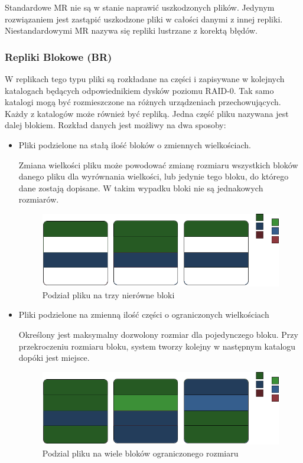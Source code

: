 Standardowe MR nie są w stanie naprawić uszkodzonych plików. Jedynym rozwiązaniem jest zastąpić uszkodzone pliki w całości danymi z innej repliki. Niestandardowymi MR nazywa się repliki lustrzane z korektą błędów.
\subsubsection{Repliki Blokowe (BR)}
W replikach tego typu pliki są rozkładane na części i zapisywane w kolejnych katalogach będących odpowiednikiem dysków poziomu RAID-0. Tak samo katalogi mogą być rozmieszczone na różnych urządzeniach przechowujących. Każdy z katalogów może również być repliką. Jedna część pliku nazywana jest dalej blokiem.
Rozkład danych jest możliwy na dwa sposoby:
\begin{itemize}
    \item Pliki podzielone na stałą ilość bloków o zmiennych wielkościach. 

            Zmiana wielkości pliku może powodować zmianę rozmiaru wszystkich bloków danego pliku dla wyrównania wielkości, lub jedynie tego bloku, do którego dane zostają dopisane. W takim wypadku bloki nie są jednakowych rozmiarów.
            \begin{figure}[h!]
                    \centering
                    \includegraphics{BR-1.png}
                    \caption{Podział pliku na trzy nierówne bloki }
                    \label{fig:br1}
            \end{figure}
    \item Pliki podzielone na zmienną ilość części o ograniczonych wielkościach

            Określony jest maksymalny dozwolony rozmiar dla pojedynczego bloku. Przy przekroczeniu rozmiaru bloku, system tworzy kolejny w następnym katalogu dopóki jest miejsce. 
            \begin{figure}[h!]
                    \centering
                    \includegraphics{BR-2.png}
                    \caption{Podzial pliku na wiele bloków ograniczonego rozmiaru}
                    \label{fig:br1}
            \end{figure}
 
\end{itemize}
